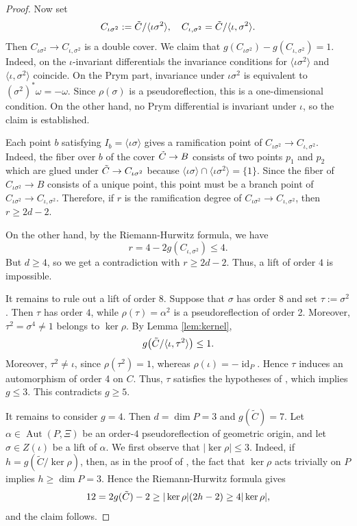 \documentclass[10pt,a4paper]{amsart}
\numberwithin{equation}{section}
\newcommand{\tC}{\Tilde{C}}
\newcommand{\s}{\sigma}
\DeclareMathOperator{\Aut}{Aut}
\DeclareMathOperator{\id}{id}
\begin{document}
\begin{proof}
Now set
$$ C_{\iota\sigma^2}:=\tC/\langle\iota\sigma^2\rangle, \ \ \ C_{\iota,\sigma^2}=\tC/\langle\iota,\sigma^2\rangle.$$
Then $C_{\iota\sigma^2}\to C_{\iota,\sigma^2}$ is a double cover. We claim that $g(C_{\iota\sigma^2})-g(C_{\iota,\s^2})=1.$ Indeed, on the $\iota$-invariant differentials the invariance conditions for $\langle\iota\sigma^2\rangle$ and $\langle\iota,\sigma^2\rangle$ coincide. On the Prym part, invariance under $\iota\sigma^2$ is equivalent to $(\sigma^2)^*\omega=-\omega$. Since $\rho(\sigma)$ is a pseudoreflection, this is a one-dimensional condition. On the other hand, no Prym differential is invariant under $\iota$, so the claim is established.

Each point $b$ satisfying $I_b = \langle \iota\s \rangle$ gives a ramification point of $C_{\iota\sigma^2}\to C_{\iota, \sigma^2}$. Indeed, the fiber over $b$ of the cover $\tC \to B$ consists of two points $p_1$ and $p_2$ which are glued under $\tC \to C_{\iota\s^2}$ because $\langle \iota\s \rangle \cap \langle \iota\s^2\rangle = \{1\}$. Since the fiber of $C_{\iota\s^2} \to B$ consists of a unique point, this point must be a branch point of $C_{\iota\s^2} \to C_{\iota,\s^2}$.
Therefore, if $r$ is the ramification degree of $C_{\iota\s^2}\to C_{\iota,\s^2}$, then $r \geq 2d-2$.

On the other hand, by the Riemann-Hurwitz formula, we have $$r=4-2g(C_{\iota, \s^2})\leq4.$$
But $d\geq4$, so we get a contradiction with $r \geq 2d-2$. Thus, a lift of order $4$ is impossible.

It remains to rule out a lift of order $8$. Suppose that $\sigma$ has order $8$ and set $\tau:=\sigma^2$. Then $\tau$ has order $4$, while $\rho(\tau)=\alpha^2$
is a pseudoreflection of order 2. Moreover, $\tau^2=\sigma^4\neq1$
belongs to $\ker\rho$. By Lemma \ref{lem:kernel},
$$g\bigl(\tC/\langle\iota,\tau^2\rangle\bigr)\leq1.$$ Moreover, $\tau^2\neq\iota$, since
$\rho(\tau^2)=1$, whereas $\rho(\iota)=-\id_P$. Hence $\tau$ induces an automorphism of order 4 on $C$. Thus, $\tau$ satisfies the hypotheses of \cite[Lemma 3.5]{ALN}, which implies $g\leq3$. This contradicts $g\geq5$.

It remains to consider \(g=4\). Then
$d=\dim P=3$ and $g(\widetilde C)=7.$  Let
$\alpha\in\Aut(P,\Xi)$ be an order-$4$ pseudoreflection of geometric origin, and let $\sigma\in Z(\iota)$ be a lift of $\alpha$. We first observe that $ |\ker\rho|\leq3.$ Indeed, if $h=g(\widetilde C/\ker\rho)$, then, as in the proof of
\cite[Lemma 3.1]{ALN}, the fact that $\ker\rho$ acts trivially on $P$
implies $h\geq\dim P=3$. Hence the  Riemann-Hurwitz formula gives
$$
12=2g(\tC)-2\geq |\ker\rho|(2h-2)\geq4|\ker\rho|,$$ and the claim follows.


\end{proof}
\end{document}
